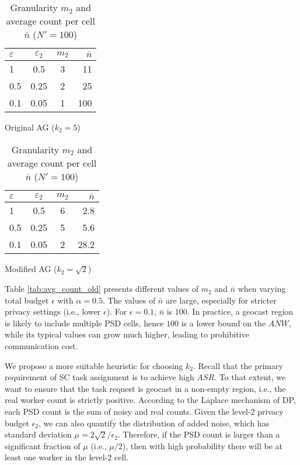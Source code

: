 \documentclass{USC-Thesis}
\numberwithin{equation}{chapter}
\begin{document}
\begin{table}[!htb]
    \begin{subtable}{.5\linewidth}
      \centering
		\begin{tabular}{ l | c | c | r }
		\hline
		$\varepsilon$ & \textbf{$\varepsilon_2$} & \textbf{$m_2$} & \textbf{$\bar{n}$} \\
		\hline
		{1} & 0.5 & 3 & 11 \\
		\hline
		{0.5} & 0.25 & 2 & 25 \\
		\hline
		{0.1} & 0.05 & 1 & 100 \\
		\hline
		\end{tabular}
		\caption{Original AG ($k_2=5$)}
		\label{tab:avg_count_old}
    \end{subtable}%
    \begin{subtable}{.5\linewidth}
      \centering
		\begin{tabular}{ l | c | c | r }
		\hline
		$\varepsilon$ & \textbf{$\varepsilon_2$} & \textbf{$m_2$} & \textbf{$\bar{n}$} \\
		\hline
		{1} & 0.5 & 6 & 2.8 \\
		\hline
		{0.5} & 0.25 & 5 & 5.6 \\
		\hline
		{0.1} & 0.05 & 2 & 28.2 \\
		\hline
		\end{tabular}
		\caption{Modified AG ($k_2=\sqrt{2}$)}
		\label{tab:avg_count_new}
    \end{subtable} 
    \caption{Granularity $m_2$ and average count per cell $\bar{n}$ ($N'=100$)}
    \label{tab:avg_count}
\end{table}

Table \ref{tab:avg_count_old} presents different values of $m_2$ and $\bar{n}$ when varying total budget $\epsilon$ with $\alpha=0.5$. The values of $\bar{n}$ are large, especially for stricter privacy settings (i.e., lower $\epsilon$). For $\epsilon=0.1$, $\bar{n}$ is $100$. In practice, a geocast region is likely to include multiple PSD cells, hence $100$ is a lower bound on the $\mathit{ANW}$, while its typical values can grow much higher, leading to prohibitive communication cost. 

We propose a more suitable heuristic for choosing $k_2$. Recall that the primary requirement of SC task assignment is to achieve high $\mathit{ASR}$. To that extent, we want to ensure that the task request is geocast in a non-empty region, i.e., the real worker count is strictly positive. According to the Laplace mechanism of DP, each PSD count is the sum of noisy and real counts. Given the level-$2$ privacy budget $\epsilon_2$, we can also quantify the distribution of added noise, which has standard deviation $\mu=2\sqrt{2}/\epsilon_2$. Therefore, if the PSD count is larger than a significant fraction of $\mu$ (i.e., $\mu/2$), then with high probability there will be at least one worker in the level-$2$ cell.
\end{document}
